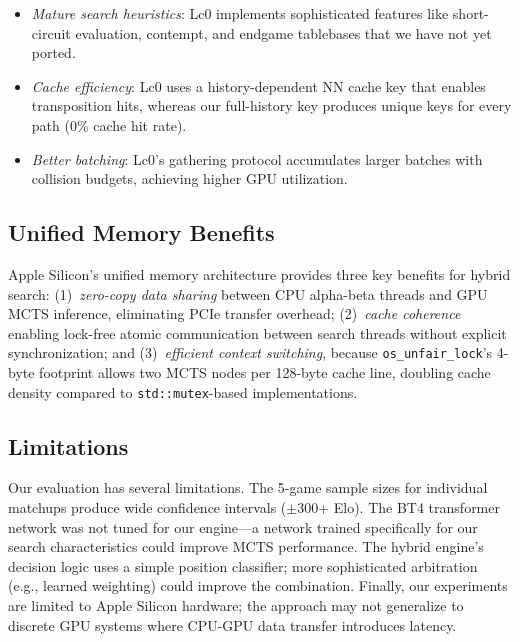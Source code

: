 \documentclass{svproc}
\newcommand{\stdmutex}{\texttt{std::\allowbreak mutex}}
\newcommand{\osunfairlock}{\texttt{os\_\allowbreak unfair\_\allowbreak lock}}
\begin{document}
\begin{itemize}
    \item \emph{Mature search heuristics}: Lc0 implements sophisticated features like short-circuit evaluation, contempt, and endgame tablebases that we have not yet ported.
    \item \emph{Cache efficiency}: Lc0 uses a history-dependent NN cache key that enables transposition hits, whereas our full-history key produces unique keys for every path (0\% cache hit rate).
    \item \emph{Better batching}: Lc0's gathering protocol accumulates larger batches with collision budgets, achieving higher GPU utilization.
\end{itemize}

\subsection{Unified Memory Benefits}

Apple Silicon's unified memory architecture provides three key benefits for hybrid search: (1)~\emph{zero-copy data sharing} between CPU alpha-beta threads and GPU MCTS inference, eliminating PCIe transfer overhead; (2)~\emph{cache coherence} enabling lock-free atomic communication between search threads without explicit synchronization; and (3)~\emph{efficient context switching}, because \osunfairlock{}'s 4-byte footprint allows two MCTS nodes per 128-byte cache line, doubling cache density compared to \stdmutex{}-based implementations.

\subsection{Limitations}

Our evaluation has several limitations. The 5-game sample sizes for individual matchups produce wide confidence intervals ($\pm$300+ Elo). The BT4 transformer network was not tuned for our engine---a network trained specifically for our search characteristics could improve MCTS performance. The hybrid engine's decision logic uses a simple position classifier; more sophisticated arbitration (e.g., learned weighting) could improve the combination. Finally, our experiments are limited to Apple Silicon hardware; the approach may not generalize to discrete GPU systems where CPU-GPU data transfer introduces latency.

\end{document}
